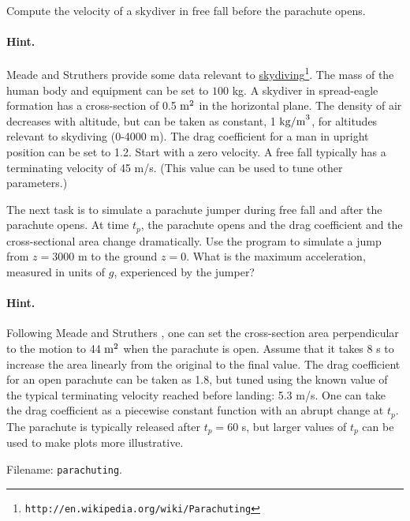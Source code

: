 \documentclass[graybox,sectrefs,envcountresetchap,open=right,final]{svmonodo}
\newenvironment{doconceexercise}{}{}
\begin{document}
\begin{doconceexercise}


Compute the velocity of
a skydiver in free fall before the parachute opens.


\paragraph{Hint.}
Meade and Struthers \cite{parachute_1999} provide some data relevant
to \href{{http://en.wikipedia.org/wiki/Parachuting}}{skydiving}\footnote{\texttt{http://en.wikipedia.org/wiki/Parachuting}}.
The mass of the human body and equipment
can be set to $100$ kg.
A skydiver in spread-eagle formation has a cross-section of 0.5 $\hbox{m}^2$
in the horizontal plane.
The density of air decreases with altitude, but can be taken
as constant, 1 $\hbox{kg/m}^3$, for altitudes relevant to
skydiving (0-4000 m).
The drag coefficient for a man in upright position can be set to 1.2.
Start with a zero velocity.
A free fall typically has a terminating velocity of 45 m/s. (This value
can be used to tune other parameters.)



The next task is to simulate
a parachute jumper during free fall and after the parachute opens.
At time $t_p$, the parachute opens and
the drag coefficient and the cross-sectional
area change dramatically.
Use the program to simulate a jump from $z=3000$ m to the ground $z=0$.
What is the maximum acceleration, measured in units of $g$,
experienced by the jumper?


\paragraph{Hint.}
Following Meade and Struthers \cite{parachute_1999}, one can set the
cross-section area perpendicular to the motion to 44 $\hbox{m}^2$
when the parachute is open. Assume that it takes 8 s to increase
the area linearly from the original to the final value.
The drag coefficient for an open
parachute can be taken as 1.8, but tuned using the known value
of the typical terminating velocity reached before landing:
5.3 m/s. One can take the drag coefficient as a piecewise constant
function with an abrupt change at $t_p$.
The parachute is typically released after $t_p=60$ s, but
larger values of $t_p$ can be used to make plots more illustrative.



\noindent Filename: \texttt{parachuting}.

\end{doconceexercise}
\end{document}
